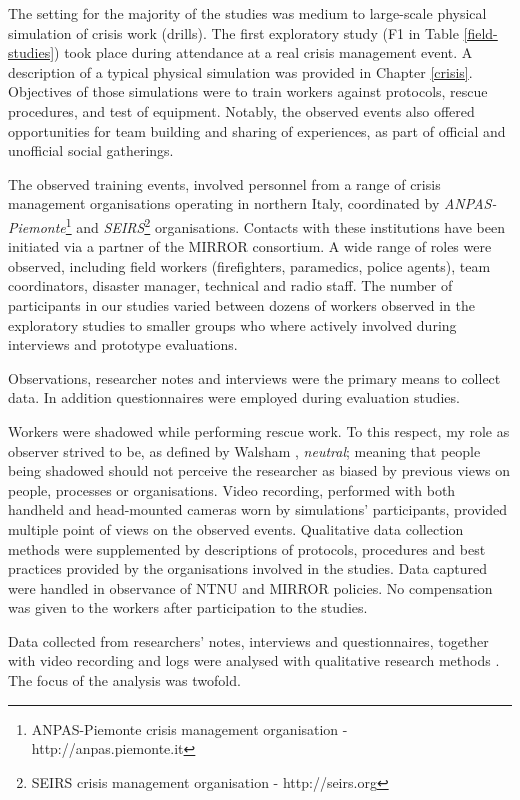 The setting for the majority of the studies was medium to large-scale physical simulation of crisis work (drills). The first exploratory study (F1 in Table \ref{field-studies}) took place during attendance at a real crisis management event. A description of a typical physical simulation was provided in Chapter \ref{crisis}.  Objectives of those simulations were to train workers against protocols, rescue procedures, and test of equipment. Notably, the observed events also offered opportunities for team building and sharing of experiences, as part of official and unofficial social gatherings.

The observed training events, involved personnel from a range of crisis management organisations operating in northern Italy, coordinated by \emph{ANPAS-Piemonte}\footnote{ANPAS-Piemonte crisis management organisation - http://anpas.piemonte.it} and \emph{SEIRS}\footnote{SEIRS crisis management organisation - http://seirs.org} organisations. Contacts with these institutions have been initiated via a partner of the MIRROR consortium. A wide range of roles were observed, including field workers (firefighters, paramedics, police agents), team coordinators, disaster manager, technical and radio staff. The number of participants in our studies varied between dozens of workers observed in the exploratory studies to smaller groups who where actively involved during interviews and prototype evaluations.

Observations, researcher notes and interviews were the primary means to collect data. In addition questionnaires were employed during evaluation studies.

Workers were shadowed while performing rescue work. To this respect, my role as observer strived to be, as defined by Walsham \autocite*{Walsham:2006bo}, \emph{neutral}; meaning that people being shadowed should not perceive the researcher as biased by previous views on people, processes or organisations. Video recording, performed with both handheld and head-mounted cameras worn by simulations' participants, provided multiple point of views on the observed events. Qualitative data collection methods were supplemented by descriptions of protocols, procedures and best practices provided by the organisations involved in the studies. Data captured were handled in observance of NTNU and MIRROR policies. No compensation was given to the workers after participation to the studies.

Data collected from researchers' notes, interviews and questionnaires, together with video recording and logs were analysed with qualitative research methods \autocite{robson1993real}. The focus of the analysis was twofold.

